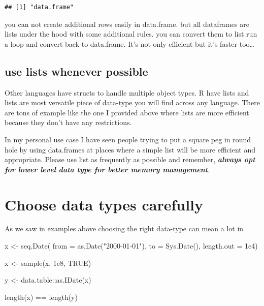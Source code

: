 \documentclass[
]{book}
\newenvironment{Shaded}{\begin{snugshade}}{\end{snugshade}}
\newcommand{\AttributeTok}[1]{\textcolor[rgb]{0.77,0.63,0.00}{#1}}
\newcommand{\ConstantTok}[1]{\textcolor[rgb]{0.00,0.00,0.00}{#1}}
\newcommand{\FloatTok}[1]{\textcolor[rgb]{0.00,0.00,0.81}{#1}}
\newcommand{\FunctionTok}[1]{\textcolor[rgb]{0.00,0.00,0.00}{#1}}
\newcommand{\NormalTok}[1]{#1}
\newcommand{\OtherTok}[1]{\textcolor[rgb]{0.56,0.35,0.01}{#1}}
\newcommand{\SpecialCharTok}[1]{\textcolor[rgb]{0.00,0.00,0.00}{#1}}
\newcommand{\StringTok}[1]{\textcolor[rgb]{0.31,0.60,0.02}{#1}}
\begin{document}
\begin{verbatim}
## [1] "data.frame"
\end{verbatim}

you can not create additional rows easily in data.frame. but all dataframes are lists under the hood with some additional rules. you can convert them to list run a loop and convert back to data.frame. It's not only efficient but it's faster too\ldots{}

\hypertarget{use-lists-whenever-possible}{%
\subsection{use lists whenever possible}\label{use-lists-whenever-possible}}

Other languages have structs to handle multiple object types. R have lists and lists are most versatile piece of data-type you will find across any language. There are tons of example like the one I provided above where lists are more efficient because they don't have any restrictions.

In my personal use case I have seen people trying to put a square peg in round hole by using data.frames at places where a simple list will be more efficient and appropriate. Please use list as frequently as possible and remember, \textbf{\emph{always opt for lower level data type for better memory management}}.

\hypertarget{choose-data-types-carefully}{%
\section{Choose data types carefully}\label{choose-data-types-carefully}}

As we saw in examples above choosing the right data-type can mean a lot in

\begin{Shaded}
\begin{Highlighting}[]
\NormalTok{x }\OtherTok{\textless{}{-}} \FunctionTok{seq.Date}\NormalTok{(}
  \AttributeTok{from =} \FunctionTok{as.Date}\NormalTok{(}\StringTok{"2000{-}01{-}01"}\NormalTok{),}
  \AttributeTok{to =} \FunctionTok{Sys.Date}\NormalTok{(),}
  \AttributeTok{length.out =} \FloatTok{1e4}\NormalTok{)}

\NormalTok{x }\OtherTok{\textless{}{-}} \FunctionTok{sample}\NormalTok{(x, }\FloatTok{1e8}\NormalTok{, }\ConstantTok{TRUE}\NormalTok{)}

\NormalTok{y }\OtherTok{\textless{}{-}}\NormalTok{ data.table}\SpecialCharTok{::}\FunctionTok{as.IDate}\NormalTok{(x)}

\FunctionTok{length}\NormalTok{(x) }\SpecialCharTok{==} \FunctionTok{length}\NormalTok{(y)}
\end{Highlighting}
\end{Shaded}
\end{document}
